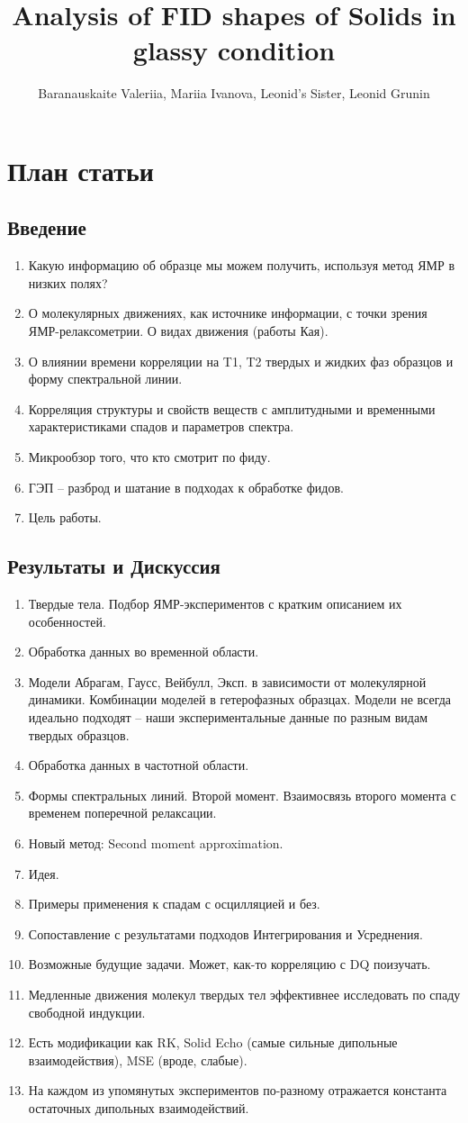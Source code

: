 \documentclass[a4paper,12pt]{article}
\title{Analysis of FID shapes of Solids in glassy condition}
\author{Baranauskaite Valeriia, Mariia Ivanova, Leonid's Sister, Leonid Grunin}
\begin{document}
\section*{План статьи}
\subsection*{Введение}
\begin{enumerate}
  \item Какую информацию об образце мы можем получить, используя метод ЯМР в низких полях?
  \item О молекулярных движениях, как источнике информации, с точки зрения ЯМР-релаксометрии. О видах движения (работы Кая).
  \item О влиянии времени корреляции на T1, T2 твердых и жидких фаз образцов и форму спектральной линии.
  \item Корреляция структуры и свойств веществ с амплитудными и временными характеристиками спадов и параметров спектра.
  \item Микрообзор того, что кто смотрит по фиду.
  \item ГЭП – разброд и шатание в подходах к обработке фидов.
  \item Цель работы.
\end{enumerate}
\subsection*{Результаты и Дискуссия}
\begin{enumerate}
  \item Твердые тела. Подбор ЯМР-экспериментов с кратким описанием их особенностей.
  \item Обработка данных во временной области.
  \item Модели Абрагам, Гаусс, Вейбулл, Эксп. в зависимости от молекулярной динамики. Комбинации моделей в гетерофазных образцах. Модели не всегда идеально подходят – наши экспериментальные данные по разным видам твердых образцов.
  \item Обработка данных в частотной области.
  \item Формы спектральных линий. Второй момент. Взаимосвязь второго момента с временем поперечной релаксации.
  \item Новый метод: Second moment approximation.
  \item Идея.
  \item Примеры применения к спадам с осцилляцией и без.
  \item Сопоставление с результатами подходов Интегрирования и Усреднения.
  \item Возможные будущие задачи. Может, как-то корреляцию с DQ поизучать.
  \item Медленные движения молекул твердых тел эффективнее исследовать по спаду свободной индукции.
  \item Есть модификации как RK, Solid Echo (самые сильные дипольные взаимодействия), MSE (вроде, слабые).
  \item На каждом из упомянутых экспериментов по-разному отражается константа остаточных дипольных взаимодействий.
\end{enumerate}
\end{document}
